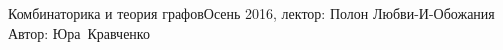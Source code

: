 


\BigHeader
	{Комбинаторика и теория графов}{Осень 2016, лектор: Полон Любви-И-Обожания}
	{Автор: Юра~Кравченко}


